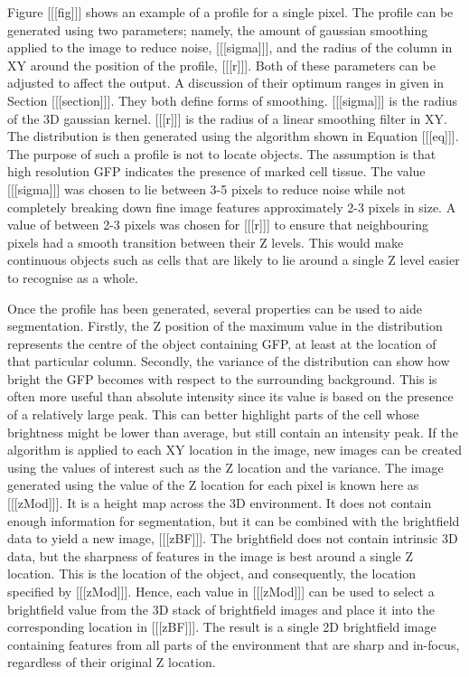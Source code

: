 \documentclass[preprint,11pt,5p,twocolumn]{elsarticle}
\begin{document}
Figure [[[fig]]] shows an example of a profile for a single pixel. The profile can be generated using two parameters; namely, the amount of gaussian smoothing applied to the image to reduce noise, [[[sigma]]], and the radius of the column in XY around the position of the profile, [[[r]]]. Both of these parameters can be adjusted to affect the output. A discussion of their optimum ranges in given in Section [[[section]]]. They both define forms of smoothing. [[[sigma]]] is the radius of the 3D gaussian kernel. [[[r]]] is the radius of a linear smoothing filter in XY. The distribution is then generated using the algorithm shown in Equation [[[eq]]]. The purpose of such a profile is not to locate objects. The assumption is that high resolution GFP indicates the presence of marked cell tissue. The value [[[sigma]]] was chosen to lie between 3-5 pixels to reduce noise while not completely breaking down fine image features approximately 2-3 pixels in size. A value of between 2-3 pixels was chosen for [[[r]]] to ensure that neighbouring pixels had a smooth transition between their Z levels. This would make continuous objects such as cells that are likely to lie around a single Z level easier to recognise as a whole.

Once the profile has been generated, several properties can be used to aide segmentation. Firstly, the Z position of the maximum value in the distribution represents the centre of the object containing GFP, at least at the location of that particular column. Secondly, the variance of the distribution can show how bright the GFP becomes with respect to the surrounding background. This is often more useful than absolute intensity since its value is based on the presence of a relatively large peak. This can better highlight parts of the cell whose brightness might be lower than average, but still contain an intensity peak. If the algorithm is applied to each XY location in the image, new images can be created using the values of interest such as the Z location and the variance. The image generated using the value of the Z location for each pixel is known here as [[[zMod]]]. It is a height map across the 3D environment. It does not contain enough information for segmentation, but it can be combined with the brightfield data to yield a new image, [[[zBF]]]. The brightfield does not contain intrinsic 3D data, but the sharpness of features in the image is best around a single Z location. This is the location of the object, and consequently, the location specified by [[[zMod]]]. Hence, each value in [[[zMod]]] can be used to select a brightfield value from the 3D stack of brightfield images and place it into the corresponding location in [[[zBF]]]. The result is a single 2D brightfield image containing features from all parts of the environment that are sharp and in-focus, regardless of their original Z location.
\end{document}
